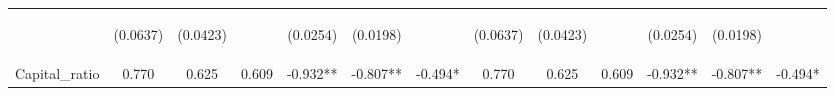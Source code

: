 \documentclass[]{article}
\begin{document}
\begin{center}
\begin{tabular}{lcccccccccccc}
\vspace{4pt} & \begin{footnotesize}(0.0637)\end{footnotesize} & \begin{footnotesize}(0.0423)\end{footnotesize} & \begin{footnotesize}\end{footnotesize} & \begin{footnotesize}(0.0254)\end{footnotesize} & \begin{footnotesize}(0.0198)\end{footnotesize} & \begin{footnotesize}\end{footnotesize} & \begin{footnotesize}(0.0637)\end{footnotesize} & \begin{footnotesize}(0.0423)\end{footnotesize} & \begin{footnotesize}\end{footnotesize} & \begin{footnotesize}(0.0254)\end{footnotesize} & \begin{footnotesize}(0.0198)\end{footnotesize} & \begin{footnotesize}\end{footnotesize} \\
Capital\_ratio & 0.770 & 0.625 & 0.609 & -0.932** & -0.807** & -0.494* & 0.770 & 0.625 & 0.609 & -0.932** & -0.807** & -0.494* \\

\end{tabular}
\end{center}
\end{document}
